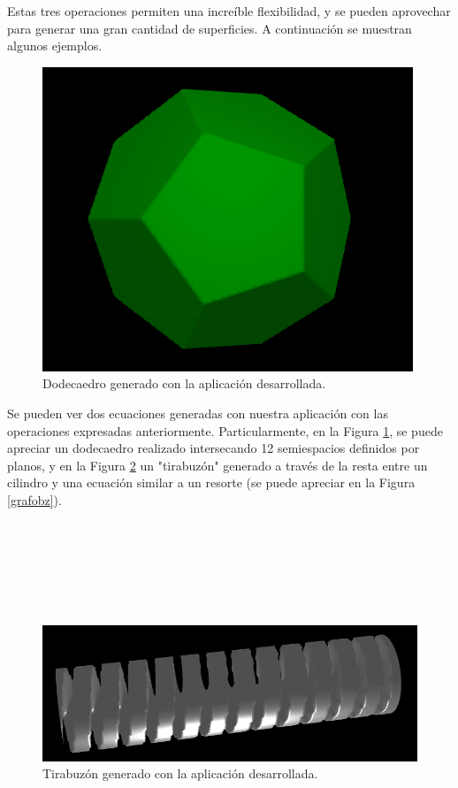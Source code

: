 \documentclass[12pt]{article}
\begin{document}
Estas tres operaciones permiten una increíble flexibilidad, y se pueden aprovechar para generar una gran cantidad de superficies. A continuación se muestran algunos ejemplos.\\
\begin{figure}
\includegraphics[width=0.9\linewidth]{dodecaedro.png} 
\caption{Dodecaedro generado con la aplicación desarrollada.}
\label{dode}
\end{figure}

Se pueden ver dos ecuaciones generadas con nuestra aplicación con las operaciones expresadas anteriormente. Particularmente, en la Figura \ref{dode}, se puede apreciar un dodecaedro realizado intersecando 12 semiespacios definidos por planos, y en la Figura \ref{tornillo} un "tirabuzón" generado a través de la resta entre un cilindro  y una ecuación similar a un resorte (se puede apreciar en la Figura \ref{grafobz}).
\\
\\
\\
\\
\\
\\
\\

\begin{figure}[h]
\includegraphics[width=0.7\linewidth,center]{tornillo.png}
\caption{Tirabuzón generado con la aplicación desarrollada.}
\label{tornillo}
\end{figure}
\end{document}
